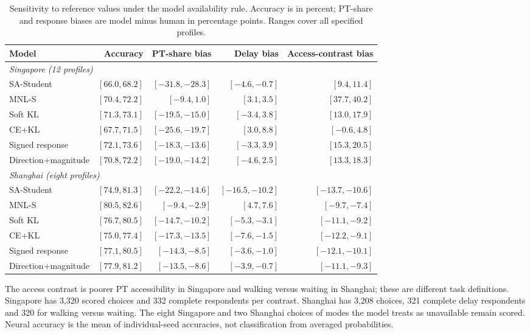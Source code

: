 \begin{table}[pos=htbp]
\centering\footnotesize
\caption{Sensitivity to reference values under the model availability rule. Accuracy is in percent; PT-share and response biases are model minus human in percentage points. Ranges cover all specified profiles.}
\label{tab:ownership_defaults}
\setlength{\tabcolsep}{3pt}
\renewcommand{\arraystretch}{1.13}
\begin{tabular*}{\linewidth}{@{\extracolsep{\fill}}lrrrr@{}}
\toprule
Model & Accuracy & PT-share bias & Delay bias & Access-contrast bias \\
\midrule
\multicolumn{5}{l}{\textit{Singapore (12 profiles)}} \\
SA-Student & $[66.0, 68.2]$ & $[-31.8, -28.3]$ & $[-4.6, -0.7]$ & $[9.4, 11.4]$ \\
MNL-S & $[70.4, 72.2]$ & $[-9.4, 1.0]$ & $[3.1, 3.5]$ & $[37.7, 40.2]$ \\
Soft KL & $[71.3, 73.1]$ & $[-19.5, -15.0]$ & $[-3.4, 3.8]$ & $[13.0, 17.9]$ \\
CE+KL & $[67.7, 71.5]$ & $[-25.6, -19.7]$ & $[3.0, 8.8]$ & $[-0.6, 4.8]$ \\
Signed response & $[72.1, 73.6]$ & $[-18.3, -13.6]$ & $[-3.3, 3.9]$ & $[15.3, 20.5]$ \\
Direction+magnitude & $[70.8, 72.2]$ & $[-19.0, -14.2]$ & $[-4.6, 2.5]$ & $[13.3, 18.3]$ \\
\midrule
\multicolumn{5}{l}{\textit{Shanghai (eight profiles)}} \\
SA-Student & $[74.9, 81.3]$ & $[-22.2, -14.6]$ & $[-16.5, -10.2]$ & $[-13.7, -10.6]$ \\
MNL-S & $[80.5, 82.6]$ & $[-9.4, -2.9]$ & $[4.7, 7.6]$ & $[-9.7, -7.4]$ \\
Soft KL & $[76.7, 80.5]$ & $[-14.7, -10.2]$ & $[-5.3, -3.1]$ & $[-11.1, -9.2]$ \\
CE+KL & $[75.0, 77.4]$ & $[-17.3, -13.5]$ & $[-7.6, -1.5]$ & $[-12.2, -9.1]$ \\
Signed response & $[77.1, 80.5]$ & $[-14.3, -8.5]$ & $[-3.6, -1.0]$ & $[-12.1, -10.1]$ \\
Direction+magnitude & $[77.9, 81.2]$ & $[-13.5, -8.6]$ & $[-3.9, -0.7]$ & $[-11.1, -9.3]$ \\
\bottomrule
\end{tabular*}
\par\smallskip\begin{minipage}{\linewidth}\footnotesize
The access contrast is poorer PT accessibility in Singapore and walking versus waiting in Shanghai; these are different task definitions. Singapore has 3,320 scored choices and 332 complete respondents per contrast. Shanghai has 3,208 choices, 321 complete delay respondents and 320 for walking versus waiting. The eight Singapore and two Shanghai choices of modes the model treats as unavailable remain scored. Neural accuracy is the mean of individual-seed accuracies, not classification from averaged probabilities.
\end{minipage}
\end{table}